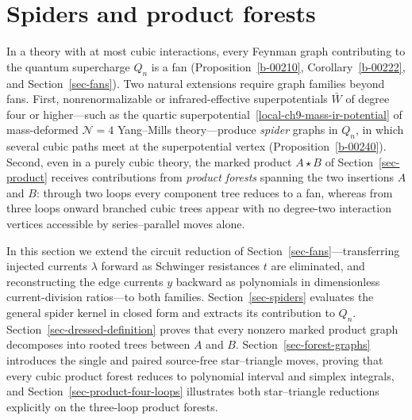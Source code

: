 \documentclass[11pt]{article}
\numberwithin{equation}{section}
\numberwithin{figure}{section}
\numberwithin{table}{section}
\begin{document}
\section{Spiders and product forests}\label{sec-forests}

In a theory with at most cubic interactions, every Feynman graph contributing to the quantum supercharge $Q_n$ is a fan (Proposition~\ref{b-00210}, Corollary~\ref{b-00222}, and Section~\ref{sec-fans}). Two natural extensions require graph families beyond fans. First, nonrenormalizable or infrared-effective superpotentials $\bar W$ of degree four or higher---such as the quartic superpotential~\eqref{local-ch9-mass-ir-potential} of mass-deformed $\mathcal N=4$ Yang--Mills theory---produce \emph{spider} graphs in $Q_n$, in which several cubic paths meet at the superpotential vertex (Proposition~\ref{b-00240}). Second, even in a purely cubic theory, the marked product $A\star B$ of Section~\ref{sec-product} receives contributions from \emph{product forests} spanning the two insertions $A$ and $B$: through two loops every component tree reduces to a fan, whereas from three loops onward branched cubic trees appear with no degree-two interaction vertices accessible by series--parallel moves alone.

In this section we extend the circuit reduction of Section~\ref{sec-fans}---transferring injected currents $\lambda$ forward as Schwinger resistances $t$ are eliminated, and reconstructing the edge currents $y$ backward as polynomials in dimensionless current-division ratios---to both families. Section~\ref{sec-spiders} evaluates the general spider kernel in closed form and extracts its contribution to $Q_n$. Section~\ref{sec-dressed-definition} proves that every nonzero marked product graph decomposes into rooted trees between $A$ and $B$. Section~\ref{sec-forest-graphs} introduces the single and paired source-free star--triangle moves, proving that every cubic product forest reduces to polynomial interval and simplex integrals, and Section~\ref{sec-product-four-loops} illustrates both star--triangle reductions explicitly on the three-loop product forests.
\end{document}
